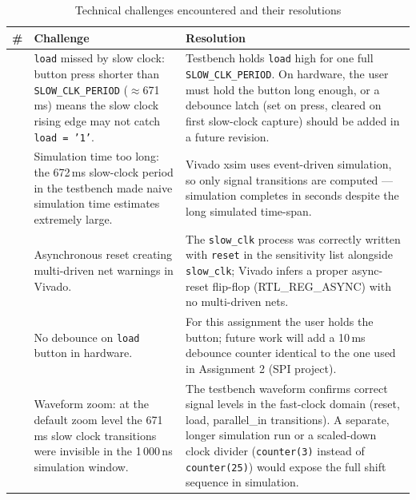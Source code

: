 \documentclass[12pt,a4paper]{report}
\begin{document}
\begin{table}[H]
  \centering
  \caption{Technical challenges encountered and their resolutions}
  \label{tab:challenges}
  \renewcommand{\arraystretch}{1.4}
  \begin{tabularx}{\linewidth}{>{\centering\arraybackslash}p{0.4cm}
                               >{\raggedright\arraybackslash}p{5.5cm}
                               >{\raggedright\arraybackslash}X}
    \toprule
    \textbf{\#} & \textbf{Challenge} & \textbf{Resolution} \\
    \midrule
    1 & \texttt{load} missed by slow clock: button press shorter than \texttt{SLOW\_CLK\_PERIOD} ($\approx$671\,ms) means the slow clock rising edge may not catch \texttt{load = '1'}.
      & Testbench holds \texttt{load} high for one full \texttt{SLOW\_CLK\_PERIOD}. On hardware, the user must hold the button long enough, or a debounce latch (set on press, cleared on first slow-clock capture) should be added in a future revision. \\
    2 & Simulation time too long: the 672\,ms slow-clock period in the testbench made naive simulation time estimates extremely large.
      & Vivado xsim uses event-driven simulation, so only signal transitions are computed --- simulation completes in seconds despite the long simulated time-span. \\
    3 & Asynchronous reset creating multi-driven net warnings in Vivado.
      & The \texttt{slow\_clk} process was correctly written with \texttt{reset} in the sensitivity list alongside \texttt{slow\_clk}; Vivado infers a proper async-reset flip-flop (RTL\_REG\_ASYNC) with no multi-driven nets. \\
    4 & No debounce on \texttt{load} button in hardware.
      & For this assignment the user holds the button; future work will add a 10\,ms debounce counter identical to the one used in Assignment 2 (SPI project). \\
    5 & Waveform zoom: at the default zoom level the 671\,ms slow clock transitions were invisible in the 1\,000\,ns simulation window.
      & The testbench waveform confirms correct signal levels in the fast-clock domain (reset, load, parallel\_in transitions). A separate, longer simulation run or a scaled-down clock divider (\texttt{counter(3)} instead of \texttt{counter(25)}) would expose the full shift sequence in simulation. \\
    \bottomrule
  \end{tabularx}
  \renewcommand{\arraystretch}{1}
\end{table}
\end{document}
